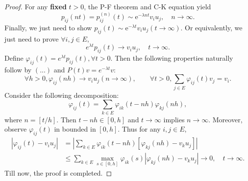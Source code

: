 \documentclass[12pt]{article}
\renewcommand{\(}{\left(}%
\renewcommand{\)}{\right)}%
\renewcommand{\[}{\left[}%
\renewcommand{\]}{\right]}%
\newtheorem{proof}{Proof.}}
\begin{document}
\begin{proof}
     For any {\bfseries fixed} $t>0$, the P-F theorem and C-K equation yield
     \begin{equation*}
      p_{ij}(nt)=p_{ij}^{(n)}(t)\sim \mathrm{e}^{-\lambda nt}v_iu_j,\quad n\to\infty.\tag{...}
     \end{equation*}
     Finally, we just need to show $p_{ij}(t)\sim\mathrm{e}^{-\lambda t}v_iu_j(t\to\infty )$. Or equivalently, 
     we just need to prove $\forall i,j\in E$,
     \begin{equation*}
       e^{\lambda t}p_{ij}(t)\to v_iu_j, \quad t\to\infty.
     \end{equation*}
     Define $\varphi_{ij}(t)=e^{\lambda t}p_{ij}(t),\forall t>0$. Then the following properties naturally 
     follow by $(...)$ and $P(t)v=e^{-\lambda t}v$:
     \begin{equation*}
       \forall h>0, \varphi_{ij}(nh)\to v_iu_j(n\to\infty),\qquad \forall t>0, \sum_{j\in E}\varphi_{ij}(t)v_j=v_i.
     \end{equation*}
     Consider the following decomposition:
     \begin{equation*}
       \varphi_{ij}(t)=\sum_{k\in E}\varphi_{ik}(t-nh)\varphi_{kj}(nh),
     \end{equation*}
     where $n=[t/h ]$. Then $t-nh\in[0,h]$ and $t\to\infty$ implies $n\to\infty$. Moreover, observe 
     $\varphi_{ij}(t)$ in bounded in $[0,h]$. Thus for any $i,j\in E$, 
     \begin{equation*}
       \begin{split}
          |\varphi_{ij}(t)-v_iu_j| &=\left|\sum_{k\in E}\varphi_{ik}(t-nh)\[\varphi_{kj}(nh)-v_ku_j\]\right|  \\
            & \leq \sum_{k\in E}\max_{s\in[0,h]}\varphi_{ik}(s)|\varphi_{kj}(nh)-v_ku_j|\to0
            ,\quad t\to\infty.
       \end{split}
     \end{equation*}
     Till now, the proof is completed.
   \end{proof}
   
\end{document}
